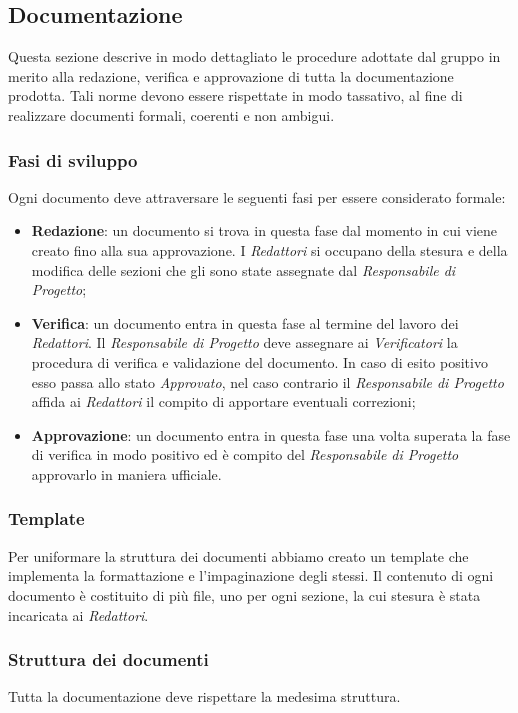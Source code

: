 \subsection{Documentazione}
Questa sezione descrive in modo dettagliato le procedure adottate dal gruppo in merito alla redazione, verifica e approvazione di tutta la documentazione prodotta. Tali norme devono essere rispettate in modo tassativo, al fine di realizzare documenti formali, coerenti e non ambigui.

\subsubsection{Fasi di sviluppo}
Ogni documento deve attraversare le seguenti fasi per essere considerato formale:
\begin{itemize}
	\item \textbf{Redazione}: un documento si trova in questa fase dal momento in cui viene creato fino alla sua approvazione. I \emph{Redattori} si occupano della stesura e della modifica delle sezioni che gli sono state assegnate dal \emph{Responsabile di Progetto};
	\item \textbf{Verifica}: un documento entra in questa fase al termine del lavoro dei \emph{Redattori}. Il \emph{Responsabile di Progetto} deve assegnare ai \emph{Verificatori} la procedura di verifica e validazione del documento. In caso di esito positivo esso passa allo stato \emph{Approvato}, nel caso contrario il \emph{Responsabile di Progetto} affida ai \emph{Redattori} il compito di apportare eventuali correzioni;
	\item \textbf{Approvazione}: un documento entra in questa fase una volta superata la fase di verifica in modo positivo ed è compito del \emph{Responsabile di Progetto} approvarlo in maniera ufficiale.
\end{itemize}

\subsubsection{Template}
Per uniformare la struttura dei documenti abbiamo creato un template  che implementa la formattazione e l'impaginazione degli stessi. Il contenuto di ogni documento è costituito di più file, uno per ogni sezione, la cui stesura è stata incaricata ai \emph{Redattori}.

\subsubsection{Struttura dei documenti}
Tutta la documentazione deve rispettare la medesima struttura.

